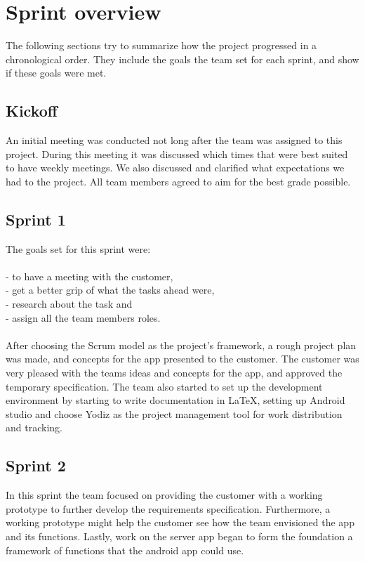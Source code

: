 \section{Sprint overview}
The following sections try to summarize how the project progressed in a chronological order. They include the goals the team set for each sprint, and show if these goals were met.

\subsection{Kickoff}
An initial meeting was conducted not long after the team was assigned to this project. During this meeting it was discussed which times that were best suited to have weekly meetings. We also discussed and clarified what expectations we had to the project. All team members agreed to aim for the best grade possible.

\subsection{Sprint 1}
The goals set for this sprint were:\\\\
- to have a meeting with the customer,\\
- get a better grip of what the tasks ahead were,\\
- research about the task and \\
- assign all the team members roles.\\\\
After choosing the Scrum model as the project's framework, a rough project plan was made, and concepts for the app presented to the customer. The customer was very pleased with the teams ideas and concepts for the app, and approved the temporary specification. The team also started to set up the development environment by starting to write documentation in \LaTeX, setting up Android studio and choose Yodiz as the project management tool for work distribution and tracking.

\subsection{Sprint 2}
In this sprint the team focused on providing the customer with a working
prototype to further develop the requirements specification. Furthermore, a
working prototype might help the customer see how the team envisioned the app
and its functions. Lastly, work on the server app began to form the
foundation a framework of functions that the android app could use.

